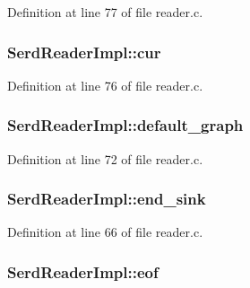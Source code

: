 Definition at line 77 of file reader.\+c.

\subsubsection[{\texorpdfstring{cur}{cur}}]{ Serd\+Reader\+Impl\+::cur}\hypertarget{struct_serd_reader_impl_a8b7b3d469e05aa98e9997608214f6886}{}\label{struct_serd_reader_impl_a8b7b3d469e05aa98e9997608214f6886}


Definition at line 76 of file reader.\+c.

\subsubsection[{\texorpdfstring{default\+\_\+graph}{default_graph}}]{ Serd\+Reader\+Impl\+::default\+\_\+graph}\hypertarget{struct_serd_reader_impl_ab571a14f450c34efd761c3b47f3b15b4}{}\label{struct_serd_reader_impl_ab571a14f450c34efd761c3b47f3b15b4}


Definition at line 72 of file reader.\+c.

\subsubsection[{\texorpdfstring{end\+\_\+sink}{end_sink}}]{ Serd\+Reader\+Impl\+::end\+\_\+sink}\hypertarget{struct_serd_reader_impl_aec86fe1b35ee482731a7b9777d2d6d58}{}\label{struct_serd_reader_impl_aec86fe1b35ee482731a7b9777d2d6d58}


Definition at line 66 of file reader.\+c.

\subsubsection[{\texorpdfstring{eof}{eof}}]{ Serd\+Reader\+Impl\+::eof}\hypertarget{struct_serd_reader_impl_a0d6a7eb8e193703fe9788e0627e64f91}{}\label{struct_serd_reader_impl_a0d6a7eb8e193703fe9788e0627e64f91}


